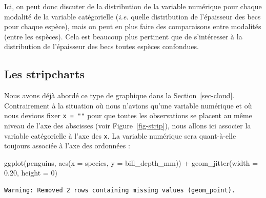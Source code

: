 \documentclass[
  letterpaper,
  DIV=11,
  numbers=noendperiod]{scrreprt}
\newenvironment{Shaded}{\begin{snugshade}}{\end{snugshade}}
\newcommand{\AttributeTok}[1]{\textcolor[rgb]{0.40,0.45,0.13}{#1}}
\newcommand{\DecValTok}[1]{\textcolor[rgb]{0.68,0.00,0.00}{#1}}
\newcommand{\FloatTok}[1]{\textcolor[rgb]{0.68,0.00,0.00}{#1}}
\newcommand{\FunctionTok}[1]{\textcolor[rgb]{0.28,0.35,0.67}{#1}}
\newcommand{\NormalTok}[1]{\textcolor[rgb]{0.00,0.23,0.31}{#1}}
\newcommand{\SpecialCharTok}[1]{\textcolor[rgb]{0.37,0.37,0.37}{#1}}
\begin{document}
Ici, on peut donc discuter de la distribution de la variable numérique
pour chaque modalité de la variable catégorielle (\emph{i.e.} quelle
distribution de l'épaisseur des becs pour chaque espèce), mais on peut
en plus faire des comparaisons entre modalités (entre les espèces). Cela
est beaucoup plus pertinent que de s'intéresser à la distribution de
l'épaisseur des becs toutes espèces confondues.

\hypertarget{les-stripcharts}{%
\subsection{Les stripcharts}\label{les-stripcharts}}

Nous avons déjà abordé ce type de graphique dans la
Section~\ref{sec-cloud}. Contrairement à la situation où nous n'avions
qu'une variable numérique et où nous devions fixer \texttt{x\ =\ ""}
pour que toutes les observations se placent au même niveau de l'axe des
abscisses (voir Figure~\ref{fig-strip}), nous allons ici associer la
variable catégorielle à l'axe des \texttt{x}. La variable numérique sera
quant-à-elle toujours associée à l'axe des ordonnées :

\begin{Shaded}
\begin{Highlighting}[]
\FunctionTok{ggplot}\NormalTok{(penguins, }\FunctionTok{aes}\NormalTok{(}\AttributeTok{x =}\NormalTok{ species, }\AttributeTok{y =}\NormalTok{ bill\_depth\_mm)) }\SpecialCharTok{+}
  \FunctionTok{geom\_jitter}\NormalTok{(}\AttributeTok{width =} \FloatTok{0.20}\NormalTok{, }\AttributeTok{height =} \DecValTok{0}\NormalTok{)}
\end{Highlighting}
\end{Shaded}

\begin{verbatim}
Warning: Removed 2 rows containing missing values (geom_point).
\end{verbatim}
\end{document}
